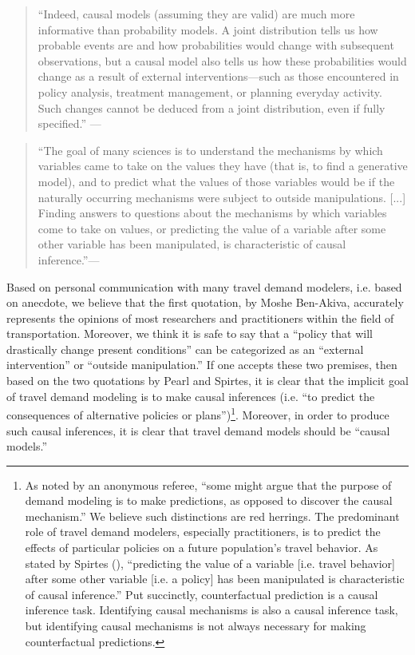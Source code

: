 \begin{quotation}
``Indeed, causal models (assuming they are valid) are much more informative than probability models. A joint distribution tells us how probable events are and how probabilities would change with subsequent observations, but a causal model also tells us how these probabilities would change as a result of external interventions---such as those encountered in policy analysis, treatment management, or planning everyday activity. Such changes cannot be deduced from a joint distribution, even if fully specified.'' ---\citep{pearl2009causality}
\end{quotation}

\begin{quotation}
``The goal of many sciences is to understand the mechanisms by which variables came to take on the values they have (that is, to find a generative model), and to predict what the values of those variables would be if the naturally occurring mechanisms were subject to outside manipulations. [...] Finding answers to questions about the mechanisms by which variables come to take on values, or predicting the value of a variable after some other variable has been manipulated, is characteristic of causal inference.''---\citep{spirtes2010introduction}
\end{quotation}

Based on personal communication with many travel demand modelers, i.e. based on anecdote, we believe that the first quotation, by Moshe Ben-Akiva, accurately represents the opinions of most researchers and practitioners within the field of transportation. Moreover, we think it is safe to say that a ``policy that will drastically change present conditions'' can be categorized as an ``external intervention'' or ``outside manipulation.'' If one accepts these two premises, then based on the two quotations by Pearl and Spirtes, it is clear that the implicit goal of travel demand modeling is to make causal inferences (i.e. ``to predict the consequences of alternative policies or plans'')\footnote{As noted by an anonymous referee, ``some might argue that the purpose of demand modeling is to make predictions, as opposed to discover the causal mechanism.'' We believe such distinctions are red herrings. The predominant role of travel demand modelers, especially practitioners, is to predict the effects of particular policies on a future population's travel behavior. As stated by Spirtes (\citeyear{spirtes2010introduction}), ``predicting the value of a variable [i.e. travel behavior] after some other variable [i.e. a policy] has been manipulated is characteristic of causal inference.'' Put succinctly, counterfactual prediction is a causal inference task. Identifying causal mechanisms is also a causal inference task, but identifying causal mechanisms is not always necessary for making counterfactual predictions.}. Moreover, in order to produce such causal inferences, it is clear that travel demand models should be ``causal models.''

